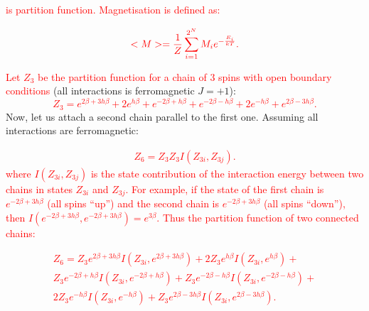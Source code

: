 \documentclass[preprint,12pt]{elsarticle}
\begin{document}
	\noindent \textcolor{red}{is partition function. Magnetisation is defined as:} 
	
	\begin{equation}
		\color{red}
		<M> = \frac{1}{Z} \sum_{i = 1}^{2^N} M_i e^{-\frac{E_i}{kT}}.
		\label{magnetisation}
	\end{equation}
	
	\textcolor{red}{Let $Z_3$ be the partition function for a chain of 3 spins with open boundary conditions} (all interactions is ferromagnetic $J = +1$):
	\textcolor{red}{
	\begin{equation}
		Z_3 = e^{2\beta + 3h\beta} + 2e^{h\beta} + e^{- 2\beta + h\beta } + e^{- 2\beta -h\beta}  + 2e^{-h\beta} + e^{2\beta - 3h\beta}.
		\label{eq:stat_3}
	\end{equation}
}
	Now, let us attach a second chain parallel to the first one. Assuming all interactions are ferromagnetic:
	
	\textcolor{red}{
	\begin{equation}
		\label{eq:stat_3_un}
		\begin{alignedat}{2}
			Z_6 =  Z_{3}Z_{3}I(Z_{3i},Z_{3j}).
		\end{alignedat}
	\end{equation}
}
	\noindent \textcolor{red}{where $I(Z_{3i},Z_{3j})$ is the state contribution of the interaction energy between two chains in states $Z_{3i}$ and $Z_{3j}$. For example, if the state of the first chain is $e^{-2\beta+3h\beta}$ (all spins ``up'') and the second chain is $e^{-2\beta+3h\beta}$ (all spins ``down''), then $I(e^{-2\beta+3h\beta}, e^{-2\beta+3h\beta})=e^{3\beta}$. Thus the partition function of two connected chains:}
	
	\textcolor{red}{
		\begin{equation}
			\label{eq:stat_3_un}
			\begin{alignedat}{3}
			Z_6 = Z_{3}e^{2\beta + 3h\beta}I(Z_{3i}, e^{2\beta + 3h\beta}) + 2Z_{3}e^{h\beta}I(Z_{3i}, e^{h\beta}) + \\
			Z_{3}e^{- 2\beta + h\beta }I(Z_{3i}, e^{- 2\beta + h\beta }) + Z_{3}e^{- 2\beta -h\beta}I(Z_{3i}, e^{- 2\beta -h\beta})  + \\
			2Z_{3}e^{-h\beta}I(Z_{3i}, e^{-h\beta}) + Z_{3}e^{2\beta - 3h\beta}I(Z_{3i}, e^{2\beta - 3h\beta}).
			\end{alignedat}
		\end{equation}
	}
	
\end{document}
